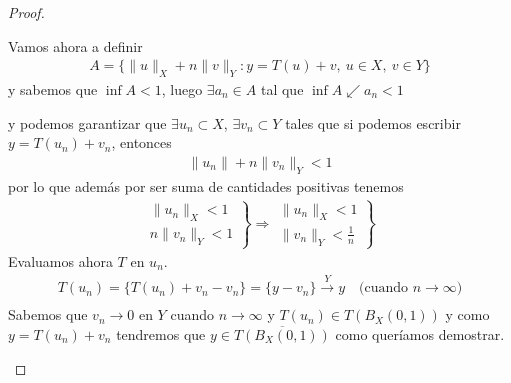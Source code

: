 \begin{teo}
\begin{proof}
\begin{itemize}
            Vamos ahora a definir
            \begin{gather*}
                A = \{\|u\|_X + n\|v\|_Y : y=T(u)+v,\ u\in X,\ v\in Y\}
            \end{gather*}
            y sabemos que $\inf A < 1$, luego $\exists a_n \in A$ tal que $\inf A \swarrow a_n < 1$

            y podemos garantizar que $\exists u_n\subset X$, $\exists v_n\subset Y$ tales que si podemos escribir $y=T(u_n) + v_n$, entonces 
            \begin{gather*}
                \|u_n\| + n\|v_n\|_Y <1
            \end{gather*}
            por lo que además por ser suma de cantidades positivas tenemos 
            \begin{gather*}
                \left.
                \begin{array}{r}
                    \|u_n\|_X<1\\
                    n\|v_n\|_Y<1
                \end{array}
                \right\} \Rightarrow
                \left.
                \begin{array}{r}
                    \|u_n\|_X<1\\
                    \|v_n\|_Y<\frac{1}{n}
                \end{array}
                \right\}
            \end{gather*}
            Evaluamos ahora $T$ en $u_n$.
            \begin{gather*}
                T(u_n) = \{T(u_n) + v_n - v_n\} = \{y-v_n\} \overset{Y}{\to}y \ \ \ \text{ (cuando $n\to \infty$)}\\
            \end{gather*}
            Sabemos que $v_n \to 0$ en $Y$ cuando $n\to \infty$ y $T(u_n)\in T(B_X(0,1))$ y como $y=T(u_n) + v_n$ tendremos que $y\in \overline{T(B_X(0,1))}$ como queríamos demostrar.
            

\end{itemize}
\end{proof}
\end{teo}

